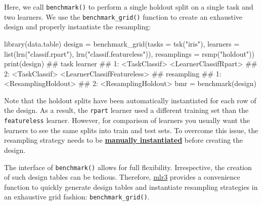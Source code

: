 \documentclass[
  11pt,
  parskip=half,
  DIV=calc,
  BCOR=10mm,
  x11names]{scrbook}
\newenvironment{Shaded}{}{}
\newcommand{\DataTypeTok}[1]{#1}
\newcommand{\KeywordTok}[1]{\textcolor[rgb]{0.00,0.00,1.00}{#1}}
\newcommand{\NormalTok}[1]{#1}
\newcommand{\StringTok}[1]{\textcolor[rgb]{0.00,0.50,0.50}{#1}}
\begin{document}
Here, we call \texttt{benchmark()} to perform a single holdout split on a single task and two learners.
We use the \texttt{benchmark\_grid()} function to create an exhaustive design and properly instantiate the resampling:

\begin{Shaded}
\begin{Highlighting}[]
\KeywordTok{library}\NormalTok{(data.table)}
\NormalTok{design =}\StringTok{ }\KeywordTok{benchmark_grid}\NormalTok{(}\DataTypeTok{tasks =} \KeywordTok{tsk}\NormalTok{(}\StringTok{"iris"}\NormalTok{), }\DataTypeTok{learners =} \KeywordTok{list}\NormalTok{(}\KeywordTok{lrn}\NormalTok{(}\StringTok{"classif.rpart"}\NormalTok{), }
  \KeywordTok{lrn}\NormalTok{(}\StringTok{"classif.featureless"}\NormalTok{)), }\DataTypeTok{resamplings =} \KeywordTok{rsmp}\NormalTok{(}\StringTok{"holdout"}\NormalTok{))}
\KeywordTok{print}\NormalTok{(design)}
\NormalTok{##             task                     learner}
\NormalTok{## 1: <TaskClassif>       <LearnerClassifRpart>}
\NormalTok{## 2: <TaskClassif> <LearnerClassifFeatureless>}
\NormalTok{##             resampling}
\NormalTok{## 1: <ResamplingHoldout>}
\NormalTok{## 2: <ResamplingHoldout>}
\NormalTok{bmr =}\StringTok{ }\KeywordTok{benchmark}\NormalTok{(design)}
\end{Highlighting}
\end{Shaded}

Note that the holdout splits have been automatically instantiated for each row of the design.
As a result, the \texttt{rpart} learner used a different training set than the \texttt{featureless} learner.
However, for comparison of learners you usually want the learners to see the same splits into train and test sets.
To overcome this issue, the resampling strategy needs to be \protect\hyperlink{resampling-inst}{\textbf{manually instantiated}} before creating the design.

The interface of \texttt{benchmark()} allows for full flexibility.
Irrespective, the creation of such design tables can be tedious.
Therefore, \href{https://mlr3.mlr-org.com}{mlr3} provides a convenience function to quickly generate design tables and instantiate resampling strategies in an exhaustive grid fashion: \texttt{benchmark\_grid()}.
\end{document}
